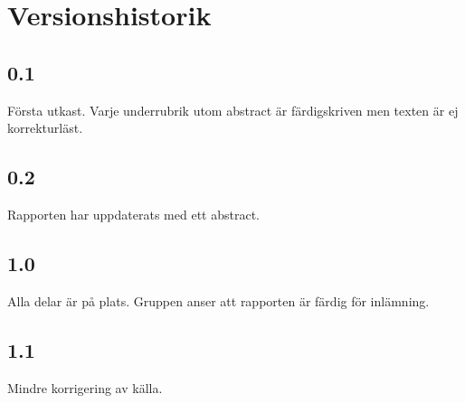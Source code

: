 \section*{Versionshistorik}
\subsection*{0.1}
Första utkast. Varje underrubrik utom abstract är färdigskriven men texten är ej korrekturläst.

\subsection*{0.2}
Rapporten har uppdaterats med ett abstract.

\subsection*{1.0}
Alla delar är på plats. Gruppen anser att rapporten är färdig för inlämning.

\subsection*{1.1}
Mindre korrigering av källa.
